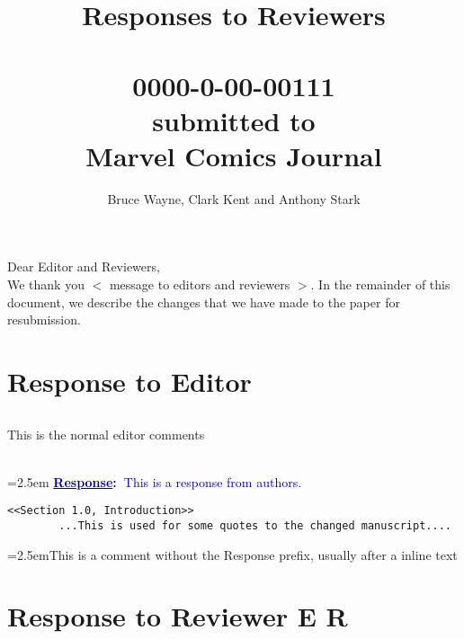 \documentclass{article}
\newcommand{\answer}[1]{~\\\vspace{0.1em} \hangindent=2.5em \textbf{\textcolor{darkblue}{\uline{Response}:~}}\textcolor{darkblue}{#1}}
\newcommand\getcurrentref[1]{%
	\ifnumequal{\value{#1}}{0}
	{E}
	{R\the\value{#1}}%
}
\newcommand{\getCurrentSectionNumber}{\getcurrentref{section}}
\newcommand{\comment}[1]{\indent\indent\hangindent=2.5em{\color{darkblue}#1}}
\begin{document}
	\title{Responses to Reviewers\\~\\0000-0-00­-00111\\submitted to\\Marvel Comics Journal}
	
	\author{Bruce Wayne, Clark Kent and Anthony Stark}
	\maketitle 
	\noindent Dear Editor and Reviewers,\\
	
	\noindent We thank you $<$ message to editors and reviewers $>$.
	In the remainder of this document, we describe the changes that we have made to the paper for resubmission.
	
%	
	
	\section{Response to Editor}
	
	\subsection{} This is the normal editor comments
	
	\answer {This is a response from authors. }
	\label{E:1}
	
	\begin{minipage}{\linewidth}
		\begin{lstlisting}[language= inlineText]
		<<Section 1.0, Introduction>>
		...This is used for some quotes to the changed manuscript....
		\end{lstlisting}
	\end{minipage}
	
	\indent\comment{This is a comment without the Response prefix, usually after a inline text}
	
		
	\section{Response to Reviewer \getCurrentSectionNumber}
	
\end{document}
